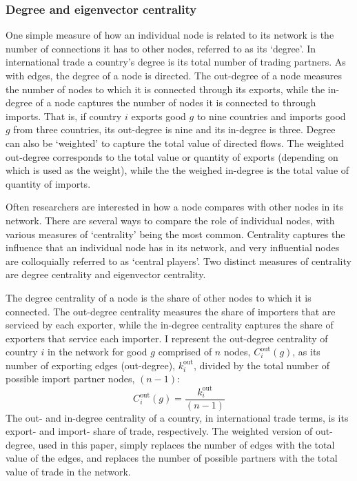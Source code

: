 \documentclass[10pt,letterpaper,pdftex]{article}
\begin{document}
\subsubsection{Degree and eigenvector centrality} \label{nw3}
One simple measure of how an individual node is related to its network is the number of connections it has to other nodes, referred to as its `degree'. In international trade a country's degree is its total number of trading partners. As with edges, the degree of a node is directed. The out-degree of a node measures the number of nodes to which it is connected through its exports, while the in-degree of a node captures the number of nodes it is connected to through imports. That is, if country $i$ exports good $g$ to nine countries and imports good $g$ from three countries, its out-degree is nine and its in-degree is three. Degree can also be `weighted' to capture the total value of directed flows.  The weighted out-degree corresponds to the total value or quantity of exports (depending on which is used as the weight), while the the weighed in-degree is the total value of quantity of imports. 

Often researchers are interested in how a node compares with other nodes in its network. There are several ways to compare the role of individual nodes, with various measures of `centrality' being the most common. Centrality captures the influence that an individual node has in its network, and very influential nodes are colloquially referred to as `central players'. Two distinct measures of centrality are degree centrality and eigenvector centrality. 

The degree centrality of a node is the share of other nodes to which it is connected. The out-degree centrality measures the share of importers that are serviced by each exporter, while the in-degree centrality captures the share of exporters that service each importer. I represent the out-degree centrality of country $i$ in the network for good $g$ comprised of $n$ nodes, $C_i^{\text{out}}(g)$, as its number of exporting edges (out-degree), $k_i^{\text{out}}$, divided by the total number of possible import partner nodes, $(n-1)$:
\begin{equation} 
C_i^{\text{out}}(g) = \frac{k_i^{\text{out}}}{(n-1)}
\end{equation}
The out- and in-degree centrality of a country, in international trade terms, is its export- and import- share of trade, respectively. The weighted version of out-degree, used in this paper, simply replaces the number of edges with the total value of the edges, and replaces the number of possible partners with the total value of trade in the network.
\end{document}

